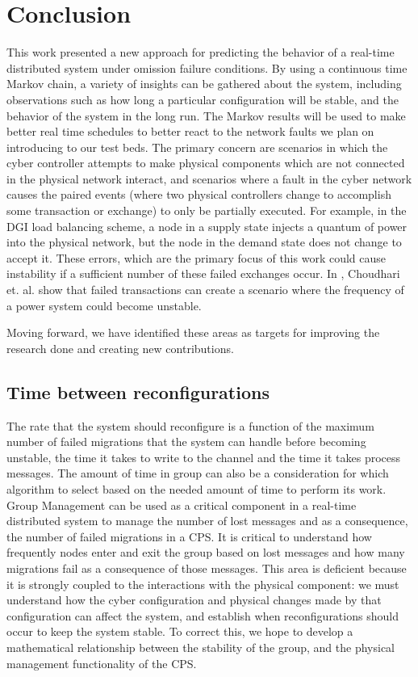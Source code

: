 \chapter{Conclusion}

This work presented a new approach for predicting the behavior of a real-time distributed system under omission failure conditions. By using a continuous time Markov chain, a variety of insights can be gathered about the system, including observations such as how long a particular configuration will be stable, and the behavior of the system in the long run.  The Markov results will be used  to make better real time schedules to better react to the network faults we plan on introducing to our test beds. The primary concern are scenarios in which the cyber controller attempts to make physical components which are not connected in the physical network interact, and scenarios where a fault in the cyber network causes the paired events (where two physical controllers change to accomplish some transaction or exchange) to only be partially executed. For example, in the DGI load balancing scheme, a node in a supply state injects a quantum of power into the physical network, but the node in the demand state does not change to accept it. These errors, which are the primary focus of this work could cause instability if a sufficient number of these failed exchanges occur. In \cite{HARINI}, Choudhari et. al. show that failed transactions can create a scenario where the frequency of a power system could become unstable. 

Moving forward, we have identified these areas as targets for improving the research done and creating new contributions.

\section{Time between reconfigurations}

 The rate that the system should reconfigure is a function of the maximum number of failed migrations that the system can handle before becoming unstable, the time it takes to write to the channel and the time it takes process messages. The amount of time in group can also be a consideration for which algorithm to select based on the needed amount of time to perform its work. Group Management can be used as a critical component in a real-time distributed system to manage the number of lost messages and as a consequence, the number of failed migrations in a CPS. It is critical to understand how frequently nodes enter and exit the group based on lost messages and how many migrations fail as a consequence of those messages. This area is deficient because it is strongly coupled to the interactions with the physical component: we must understand how the cyber configuration and physical changes made by that configuration can affect the system, and establish when reconfigurations should occur to keep the system stable. To correct this, we hope to develop a mathematical relationship between the stability of the group, and the physical management functionality of the CPS.


